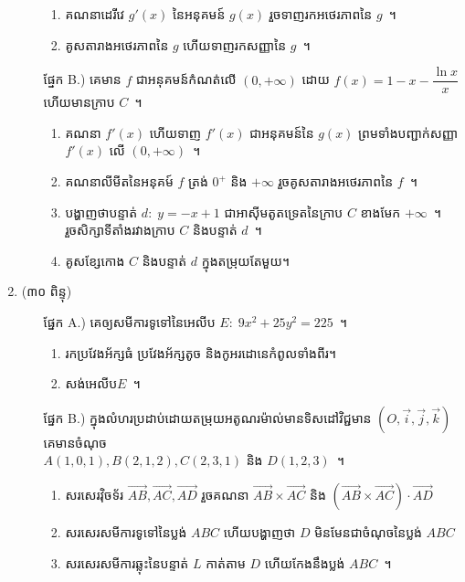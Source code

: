 \documentclass[10pt,a5paper]{article}
\begin{document}
\begin{enumerate}
\begin{itemize}
		\begin{enumerate}
			\item គណនាដេរីវេ $ g'(x) $ នៃអនុគមន៍ $ g(x) $ រួចទាញរកអថេរភាពនៃ $ g $~។
			\item គូសតារាងអថេរភាពនៃ $ g $ ហើយទាញរកសញ្ញានៃ $ g $~។
		\end{enumerate}
		\item[ផ្នែក B.)] គេមាន $ f $ ជាអនុគមន៍កំណត់លើ $ (0,+\infty) $ ដោយ $ f(x)=1-x-\dfrac{\ln x}{x} $ ហើយមានក្រាប $ C $~។
		\begin{enumerate}
			\item គណនា $ f'(x) $ ហើយទាញ $ f'(x) $ ជាអនុគមន៍នៃ $ g(x) $ ព្រមទាំងបញ្ជាក់សញ្ញា $ f'(x) $ លើ $ (0,+\infty) $~។
			\item គណនាលីមីត​នៃអនុគម៍ $ f $ ត្រង់ $ 0^+ $ និង $ +\infty $ រួចគូសតារាងអថេរភាពនៃ $ f $~។
			\item បង្ហាញថាបន្ទាត់ $ d:\;y=-x+1 $ ជាអាស៊ីមតូតទ្រេតនៃក្រាប $ C $ ខាងមែក $ +\infty $~។\\
			រួចសិក្សាទីតាំងរវាងក្រាប $ C $ និងបន្ទាត់ $ d $~។
			\item គូសខ្សែកោង $ C $ និងបន្ទាត់ $ d $ ក្នុងតម្រុយតែមួយ។
		\end{enumerate}
	\end{itemize}
	\item (៣០ ពិន្ទុ) 
	\begin{itemize}
		\item[ផ្នែក A.)] គេឲ្យសមីការទូទៅនៃអេលីប $ E:\;9x^2+25y^2=225 $~។
		\begin{enumerate}
			\item រកប្រវែងអ័ក្សធំ ប្រវែងអ័ក្សតូច និងកូអរដោនេកំពូលទាំងពីរ។
			\item សង់អេលីប​ $ E $~។
		\end{enumerate}
		\item[ផ្នែក B.)] ក្នុងលំហរប្រដាប់ដោយតម្រុយអតូណរម៉ាល់មានទិសដៅវិជ្ជមាន $ (O,\vec{i},\vec{j},\vec{k}) $ គេមានចំណុច​\\
		$ A(1,0,1),B(2,1,2),C(2,3,1) $ និង $ D(1,2,3) $~។
		\begin{enumerate}
			\item សរសេរវ៉ិចទ័រ $ \overrightarrow{AB},\overrightarrow{AC},\overrightarrow{AD} $ រួចគណនា $ \overrightarrow{AB}\times\overrightarrow{AC} $ និង $ (\overrightarrow{AB}\times\overrightarrow{AC})\cdot\overrightarrow{AD} $
			\item សរសេរសមីការទូទៅនៃប្លង់ $ ABC $ ហើយបង្ហាញថា $ D $ មិនមែនជាចំណុចនៃប្លង់ $ ABC $
			\item សរសេរសមីការឆ្លុះនៃបន្ទាត់ $ L $ កាត់តាម $ D $ ហើយកែងនឹងប្លង់ $ ABC $~។
		\end{enumerate}
	\end{itemize}
\end{enumerate}
\end{document}

